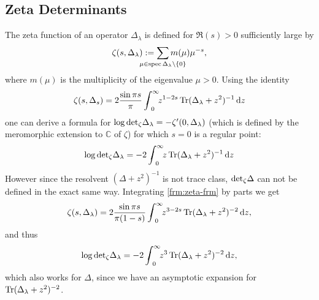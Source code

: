 \subsection{Zeta Determinants}
The zeta function of an operator $\Delta_\lambda$ is defined for $\Re(s) > 0$
sufficiently large by
\begin{equation}
  \zeta(s,\Delta_\lambda) :=
  \sum_{\mathclap{\mu\in\operatorname{spec}\Delta_\lambda\setminus\{0\}}}
  m(\mu)\mu^{-s},
\end{equation}
where $m(\mu)$ is the multiplicity of the eigenvalue $\mu > 0$. Using the
identity %
\begin{equation}
  \label{frm:zeta-frm}
  \zeta(s,\Delta_s) = 2 \frac{\sin\pi
  s}{\pi}\,\Regint[0]{z}{z^{1-2s}\Tr(\Delta_\lambda + z^2)^{-1}}
\end{equation}
one can derive a formula for $\log\zdet\Delta_\lambda =
-\zeta'(0,\Delta_\lambda)$ (which is defined by the meromorphic extension to
$\mathbb{C}$ of $\zeta$) for which $s=0$ is a regular point:
\begin{align}
  \log\zdet\Delta_\lambda = -2\,\Regint[0]{z}{z\Tr(\Delta_\lambda + z^2)^{-1}}
\end{align}
However since the resolvent $(\Delta + z^2)^{-1}$ is not trace class,
$\zdet\Delta$ can not be defined in the exact same way. Integrating
\cref{frm:zeta-frm} by parts we get
\begin{equation*}
  \zeta(s,\Delta_\lambda) = 2\frac{\sin\pi
  s}{\pi(1-s)}\,\Regint[0]{z}{z^{3-2s}\Tr(\Delta_\lambda + z^2)^{-2}},
\end{equation*}
and thus
\begin{equation*}
  \log\zdet\Delta_\lambda = -2\, \Regint[0]{z}{z^3\Tr(\Delta_\lambda + z^2)^{-2}},
\end{equation*}
which also works for $\Delta$, since we have an asymptotic expansion for
$\Tr(\Delta_\lambda + z^2)^{-2}$.

